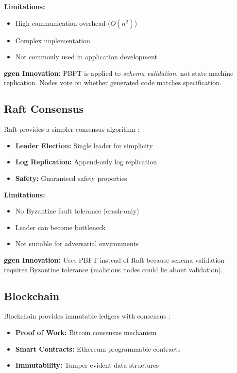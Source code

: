 \textbf{Limitations:}
\begin{itemize}
    \item High communication overhead (\(O(n^2)\))
    \item Complex implementation
    \item Not commonly used in application development
\end{itemize}

\textbf{ggen Innovation:} PBFT is applied to \textit{schema validation}, not state machine replication. Nodes vote on whether generated code matches specification.

\subsection{Raft Consensus}

Raft provides a simpler consensus algorithm \cite{ongaro2014raft}:

\begin{itemize}
    \item \textbf{Leader Election:} Single leader for simplicity
    \item \textbf{Log Replication:} Append-only log replication
    \item \textbf{Safety:} Guaranteed safety properties
\end{itemize}

\textbf{Limitations:}
\begin{itemize}
    \item No Byzantine fault tolerance (crash-only)
    \item Leader can become bottleneck
    \item Not suitable for adversarial environments
\end{itemize}

\textbf{ggen Innovation:} Uses PBFT instead of Raft because schema validation requires Byzantine tolerance (malicious nodes could lie about validation).

\subsection{Blockchain}

Blockchain provides immutable ledgers with consensus \cite{nakamoto2008bitcoin}:

\begin{itemize}
    \item \textbf{Proof of Work:} Bitcoin consensus mechanism
    \item \textbf{Smart Contracts:} Ethereum programmable contracts
    \item \textbf{Immutability:} Tamper-evident data structures
\end{itemize}

